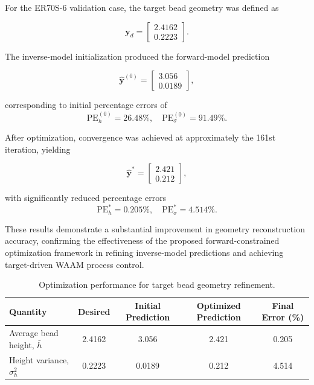 \documentclass[11pt]{article}
\begin{document}
For the ER70S-6 validation case, the target bead geometry was defined as

\begin{equation}
\mathbf{y}_{d} =
\begin{bmatrix}
2.4162 \\
0.2223
\end{bmatrix}.
\end{equation}

The inverse-model initialization produced the forward-model prediction

\begin{equation}
\hat{\mathbf{y}}^{(0)} =
\begin{bmatrix}
3.056 \\
0.0189
\end{bmatrix},
\end{equation}

corresponding to initial percentage errors of
\begin{equation}
\mathrm{PE}_{h}^{(0)} = 26.48\%, \quad
\mathrm{PE}_{\sigma}^{(0)} = 91.49\%.
\end{equation}

After optimization, convergence was achieved at approximately the 161st iteration, yielding

\begin{equation}
\hat{\mathbf{y}}^{*} =
\begin{bmatrix}
2.421 \\
0.212
\end{bmatrix},
\end{equation}

with significantly reduced percentage errors
\begin{equation}
\mathrm{PE}_{h}^{*} = 0.205\%, \quad
\mathrm{PE}_{\sigma}^{*} = 4.514\%.
\end{equation}

These results demonstrate a substantial improvement in geometry reconstruction accuracy, confirming the effectiveness of the proposed forward-constrained optimization framework in refining inverse-model predictions and achieving target-driven WAAM process control.

\begin{table}[htbp]
\centering
\caption{Optimization performance for target bead geometry refinement.}
\label{tab:optimization_performance}
\begin{tabular}{lcccc}
\hline
Quantity & Desired & Initial Prediction & Optimized Prediction & Final Error (\%) \\
\hline
Average bead height, $\bar{h}$ & 2.4162 & 3.056 & 2.421 & 0.205 \\
Height variance, $\sigma_h^2$ & 0.2223 & 0.0189 & 0.212 & 4.514 \\
\hline
\end{tabular}
\end{table}
\end{document}

